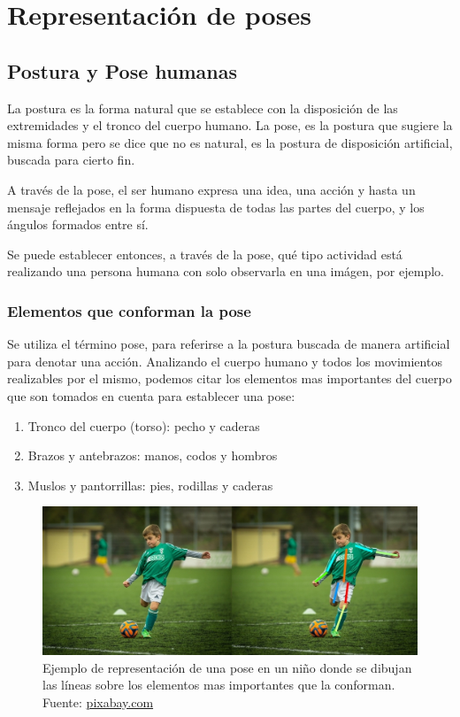 \documentclass[a4paper,12pt,oneside,spanish]{book}
\begin{document}
\newpage
\chapter{Representación de poses}
\section{Postura y Pose humanas}

La postura es la forma natural que se establece con la disposición de las extremidades y el tronco del cuerpo humano. La pose, es la postura que sugiere la misma forma pero se dice que no es natural, es la postura de disposición artificial, buscada para cierto fin. \par

A través de la pose, el ser humano expresa una idea, una acción y hasta un mensaje reflejados en la forma dispuesta de todas las partes del cuerpo, y los ángulos formados entre sí. \par

Se puede establecer entonces, a través de la pose, qué tipo actividad está realizando una persona humana con solo observarla en una imágen, por ejemplo. \par

\subsection{Elementos que conforman la pose}
Se utiliza el término pose, para referirse a la postura buscada de manera artificial para denotar una acción. Analizando el cuerpo humano y todos los movimientos realizables por el mismo, podemos citar los elementos mas importantes del cuerpo que son tomados en cuenta para establecer una pose: 
\begin{enumerate}
	\baselineskip 16pt
	\item Tronco del cuerpo (torso): pecho y caderas  
	\item Brazos y antebrazos: manos, codos y hombros  
	\item Muslos y pantorrillas: pies, rodillas y caderas
\end{enumerate}	\baselineskip 16pt

\begin{figure}[h!]
	\includegraphics[width=350pt]{Imagenes/pose1.jpg}
	\centering
	\caption{Ejemplo de representación de una pose en un niño donde  se dibujan las líneas sobre los elementos mas importantes que la conforman. Fuente: \url{pixabay.com}}
	\label{fig:pose1}
\end{figure}
\end{document}
